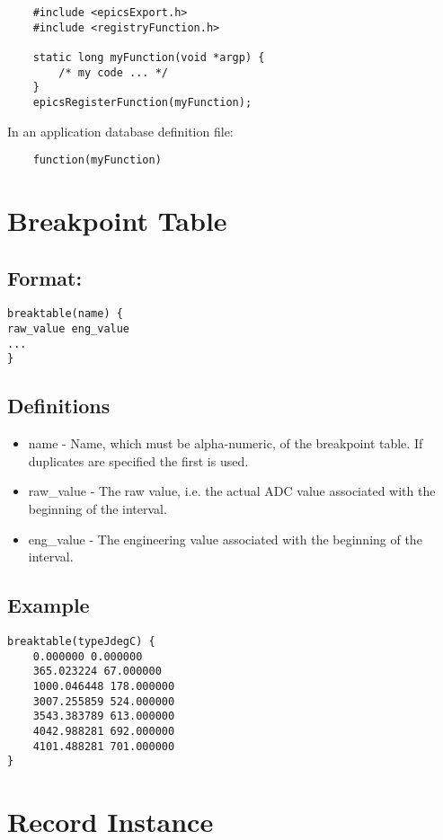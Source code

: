\begin{verbatim}    #include <epicsExport.h>
    #include <registryFunction.h>
    
    static long myFunction(void *argp) {
        /* my code ... */
    }
    epicsRegisterFunction(myFunction);
\end{verbatim}In an application database definition file:

\begin{verbatim}    function(myFunction)
\end{verbatim}\section{Breakpoint Table}

\subsection{Format:}

\begin{verbatim}breaktable(name) {
raw_value eng_value
...
}
\end{verbatim}\subsection{Definitions}

\begin{itemize}\item {}name - Name, which must be alpha-numeric, of the breakpoint table. If duplicates are specified the first is used.

\item {}raw\_value - The raw value, i.e. the actual ADC value associated with the beginning of the interval.

\item {}eng\_value - The engineering value associated with the beginning of the interval.

\end{itemize}\subsection{Example}

\begin{verbatim}breaktable(typeJdegC) {
    0.000000 0.000000
    365.023224 67.000000
    1000.046448 178.000000
    3007.255859 524.000000
    3543.383789 613.000000
    4042.988281 692.000000
    4101.488281 701.000000
}
\end{verbatim}\section{Record Instance}

